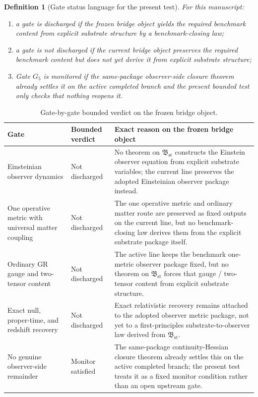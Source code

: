 \documentclass[11pt]{article}
\newcommand{\StableBridgeObject}{\mathfrak B_{\mathrm{st}}}
\newcommand{\GateFive}{G_{5}}
\newtheorem{definition}{Definition}
\begin{document}
\begin{definition}[Gate status language for the present test]
For this manuscript:
\begin{enumerate}
    \item a gate is \emph{discharged} if the frozen bridge object yields the required benchmark content from explicit substrate structure by a benchmark-closing law;
    \item a gate is \emph{not discharged} if the current bridge object preserves the required benchmark content but does not yet derive it from explicit substrate structure;
    \item Gate \(\GateFive\) is \emph{monitored} if the same-package observer-side closure theorem already settles it on the active completed branch and the present bounded test only checks that nothing reopens it.
\end{enumerate}
\end{definition}

\begin{table}[ht]
\centering
\renewcommand{\arraystretch}{1.2}
\begin{tabular}{>{\raggedright\arraybackslash}p{} >{\raggedright\arraybackslash}p{} >{\raggedright\arraybackslash}p{}}
\toprule
\textbf{Gate} & \textbf{Bounded verdict} & \textbf{Exact reason on the frozen bridge object} \\
\midrule
Einsteinian observer dynamics & Not discharged & No theorem on \(\StableBridgeObject\) constructs the Einstein observer equation from explicit substrate variables; the current line preserves the adopted Einsteinian observer package instead. \\
One operative metric with universal matter coupling & Not discharged & The one operative metric and ordinary matter route are preserved as fixed outputs on the current line, but no benchmark-closing law derives them from the explicit substrate package itself. \\
Ordinary GR gauge and two-tensor content & Not discharged & The active line keeps the benchmark one-metric observer package fixed, but no theorem on \(\StableBridgeObject\) forces that gauge / two-tensor content from explicit substrate structure. \\
Exact null, proper-time, and redshift recovery & Not discharged & Exact relativistic recovery remains attached to the adopted observer metric package, not yet to a first-principles substrate-to-observer law derived from \(\StableBridgeObject\). \\
No genuine observer-side remainder & Monitor satisfied & The same-package continuity-Hessian closure theorem already settles this on the active completed branch; the present test treats it as a fixed monitor condition rather than an open upstream gate. \\
\bottomrule
\end{tabular}
\caption{Gate-by-gate bounded verdict on the frozen bridge object.}
\label{tab:gates}
\end{table}
\end{document}
